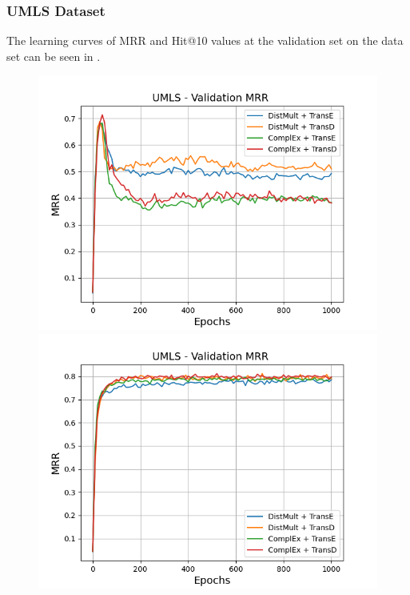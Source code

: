 \subsubsection{UMLS Dataset}
\label{subsubsec:methods_umls}

The learning curves of MRR and Hit@10 values at the validation set on the \umls data set can be seen in .
\begin{figure}
    \centering
    \begin{minipage}{.5\textwidth}
      \centering
      \includegraphics[width=0.9\linewidth]{figures/results/gan_train/not_pretrained/uncertainty/max/entropy/umls/1k_epochs/uncertainty_umls_mrrs.png}
    \end{minipage}%
    \begin{minipage}{.5\textwidth}
      \centering
      \includegraphics[width=0.9\linewidth]{figures/results/gan_train/not_pretrained/uncertainty/max_distribution/entropy/umls/1k_epochs/uncertainty_umls_mrrs.png}

\end{minipage}
\end{figure}
